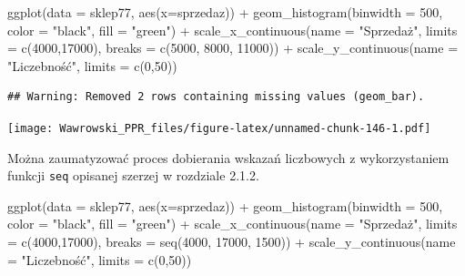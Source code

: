 \documentclass[
]{book}
\newenvironment{Shaded}{\begin{snugshade}}{\end{snugshade}}
\newcommand{\AttributeTok}[1]{\textcolor[rgb]{0.77,0.63,0.00}{#1}}
\newcommand{\DecValTok}[1]{\textcolor[rgb]{0.00,0.00,0.81}{#1}}
\newcommand{\FunctionTok}[1]{\textcolor[rgb]{0.00,0.00,0.00}{#1}}
\newcommand{\NormalTok}[1]{#1}
\newcommand{\SpecialCharTok}[1]{\textcolor[rgb]{0.00,0.00,0.00}{#1}}
\newcommand{\StringTok}[1]{\textcolor[rgb]{0.31,0.60,0.02}{#1}}
\begin{document}
\begin{Shaded}
\begin{Highlighting}[]
\FunctionTok{ggplot}\NormalTok{(}\AttributeTok{data =}\NormalTok{ sklep77, }\FunctionTok{aes}\NormalTok{(}\AttributeTok{x=}\NormalTok{sprzedaz)) }\SpecialCharTok{+}
  \FunctionTok{geom\_histogram}\NormalTok{(}\AttributeTok{binwidth =} \DecValTok{500}\NormalTok{, }
                 \AttributeTok{color =} \StringTok{"black"}\NormalTok{, }\AttributeTok{fill =} \StringTok{"green"}\NormalTok{) }\SpecialCharTok{+}
  \FunctionTok{scale\_x\_continuous}\NormalTok{(}\AttributeTok{name =} \StringTok{"Sprzedaż"}\NormalTok{, }
                     \AttributeTok{limits =} \FunctionTok{c}\NormalTok{(}\DecValTok{4000}\NormalTok{,}\DecValTok{17000}\NormalTok{),}
                     \AttributeTok{breaks =} \FunctionTok{c}\NormalTok{(}\DecValTok{5000}\NormalTok{, }\DecValTok{8000}\NormalTok{, }\DecValTok{11000}\NormalTok{)) }\SpecialCharTok{+}
  \FunctionTok{scale\_y\_continuous}\NormalTok{(}\AttributeTok{name =} \StringTok{"Liczebność"}\NormalTok{,}
                     \AttributeTok{limits =} \FunctionTok{c}\NormalTok{(}\DecValTok{0}\NormalTok{,}\DecValTok{50}\NormalTok{))}
\end{Highlighting}
\end{Shaded}

\begin{verbatim}
## Warning: Removed 2 rows containing missing values (geom_bar).
\end{verbatim}

\texttt{[image: Wawrowski\_PPR\_files/figure-latex/unnamed-chunk-146-1.pdf]}

Można zaumatyzować proces dobierania wskazań liczbowych z wykorzystaniem funkcji \texttt{seq} opisanej szerzej w rozdziale 2.1.2.

\begin{Shaded}
\begin{Highlighting}[]
\FunctionTok{ggplot}\NormalTok{(}\AttributeTok{data =}\NormalTok{ sklep77, }\FunctionTok{aes}\NormalTok{(}\AttributeTok{x=}\NormalTok{sprzedaz)) }\SpecialCharTok{+}
  \FunctionTok{geom\_histogram}\NormalTok{(}\AttributeTok{binwidth =} \DecValTok{500}\NormalTok{, }
                 \AttributeTok{color =} \StringTok{"black"}\NormalTok{, }\AttributeTok{fill =} \StringTok{"green"}\NormalTok{) }\SpecialCharTok{+}
  \FunctionTok{scale\_x\_continuous}\NormalTok{(}\AttributeTok{name =} \StringTok{"Sprzedaż"}\NormalTok{, }
                     \AttributeTok{limits =} \FunctionTok{c}\NormalTok{(}\DecValTok{4000}\NormalTok{,}\DecValTok{17000}\NormalTok{),}
                     \AttributeTok{breaks =} \FunctionTok{seq}\NormalTok{(}\DecValTok{4000}\NormalTok{, }\DecValTok{17000}\NormalTok{, }\DecValTok{1500}\NormalTok{)) }\SpecialCharTok{+}
  \FunctionTok{scale\_y\_continuous}\NormalTok{(}\AttributeTok{name =} \StringTok{"Liczebność"}\NormalTok{,}
                     \AttributeTok{limits =} \FunctionTok{c}\NormalTok{(}\DecValTok{0}\NormalTok{,}\DecValTok{50}\NormalTok{))}
\end{Highlighting}
\end{Shaded}
\end{document}
